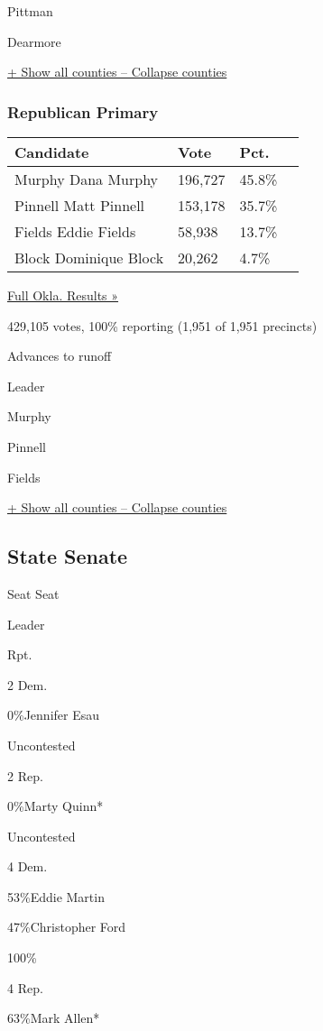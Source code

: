  Pittman

 Dearmore

\protect\hyperlink{}{+ Show all counties -- Collapse counties}

\hypertarget{republican-primary-6}{%
\subsubsection{Republican Primary}\label{republican-primary-6}}

\begin{longtable}[]{@{}llll@{}}
\toprule
Candidate & Vote & Pct. &\tabularnewline
\midrule
\endhead
 Murphy Dana Murphy & 196,727 & 45.8\% &\tabularnewline
 Pinnell Matt Pinnell & 153,178 & 35.7\% &\tabularnewline
 Fields Eddie Fields & 58,938 & 13.7\% &\tabularnewline
 Block Dominique Block & 20,262 & 4.7\% &\tabularnewline
\bottomrule
\end{longtable}

\href{https://www.nytimes3xbfgragh.onion/elections/results/oklahoma}{Full
Okla. Results »}

429,105 votes, 100\% reporting (1,951 of 1,951 precincts)

 Advances to runoff

Leader

 Murphy

 Pinnell

 Fields

\protect\hyperlink{}{+ Show all counties -- Collapse counties}

\hypertarget{state-senate}{%
\subsection{State Senate}\label{state-senate}}

Seat Seat

Leader

Rpt.

2 Dem.

 0\%Jennifer Esau

Uncontested

2 Rep.

 0\%Marty Quinn*

Uncontested

4 Dem.

 53\%Eddie Martin

 47\%Christopher Ford

100\%

4 Rep.

 63\%Mark Allen*

